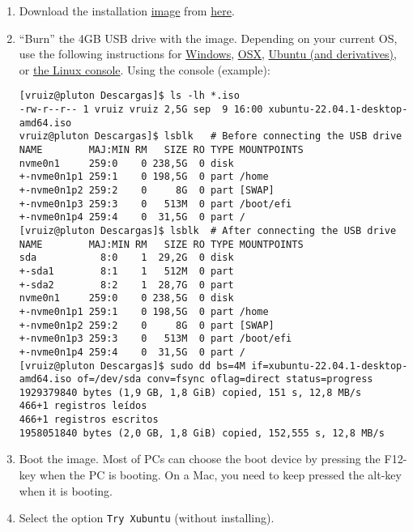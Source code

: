 \begin{enumerate}
\item Download the
  installation \href{https://en.wikipedia.org/wiki/Disk_image}{image}
  from \href{https://xubuntu.org/download/}{here}.
  
\item ``Burn'' the 4GB USB drive with the image. Depending on your
  current OS, use the following instructions
  for \href{https://ubuntu.com/tutorials/create-a-usb-stick-on-windows#1-overview}{Windows}, \href{https://ubuntu.com/tutorials/create-a-usb-stick-on-macos#1-overview}{OSX}, \href{https://ubuntu.com/tutorials/create-a-usb-stick-on-ubuntu#1-overview}{Ubuntu
    (and derivatives)},
  or \href{https://askubuntu.com/questions/372607/how-to-create-a-bootable-ubuntu-usb-flash-drive-from-terminal}{the Linux
    console}. Using the console (example):
  
\begin{verbatim}
[vruiz@pluton Descargas]$ ls -lh *.iso
-rw-r--r-- 1 vruiz vruiz 2,5G sep  9 16:00 xubuntu-22.04.1-desktop-amd64.iso
vruiz@pluton Descargas]$ lsblk   # Before connecting the USB drive
NAME        MAJ:MIN RM   SIZE RO TYPE MOUNTPOINTS
nvme0n1     259:0    0 238,5G  0 disk 
+-nvme0n1p1 259:1    0 198,5G  0 part /home
+-nvme0n1p2 259:2    0     8G  0 part [SWAP]
+-nvme0n1p3 259:3    0   513M  0 part /boot/efi
+-nvme0n1p4 259:4    0  31,5G  0 part /
[vruiz@pluton Descargas]$ lsblk  # After connecting the USB drive 
NAME        MAJ:MIN RM   SIZE RO TYPE MOUNTPOINTS
sda           8:0    1  29,2G  0 disk 
+-sda1        8:1    1   512M  0 part 
+-sda2        8:2    1  28,7G  0 part 
nvme0n1     259:0    0 238,5G  0 disk 
+-nvme0n1p1 259:1    0 198,5G  0 part /home
+-nvme0n1p2 259:2    0     8G  0 part [SWAP]
+-nvme0n1p3 259:3    0   513M  0 part /boot/efi
+-nvme0n1p4 259:4    0  31,5G  0 part /
[vruiz@pluton Descargas]$ sudo dd bs=4M if=xubuntu-22.04.1-desktop-amd64.iso of=/dev/sda conv=fsync oflag=direct status=progress
1929379840 bytes (1,9 GB, 1,8 GiB) copied, 151 s, 12,8 MB/s
466+1 registros leídos
466+1 registros escritos
1958051840 bytes (2,0 GB, 1,8 GiB) copied, 152,555 s, 12,8 MB/s
\end{verbatim}

\item Boot the image. Most of PCs can choose the boot device by pressing the
  F12-key when the PC is booting. On a Mac, you need to keep pressed
  the alt-key when it is booting.
  
\item Select the option \texttt{Try Xubuntu} (without installing).


\end{enumerate}
